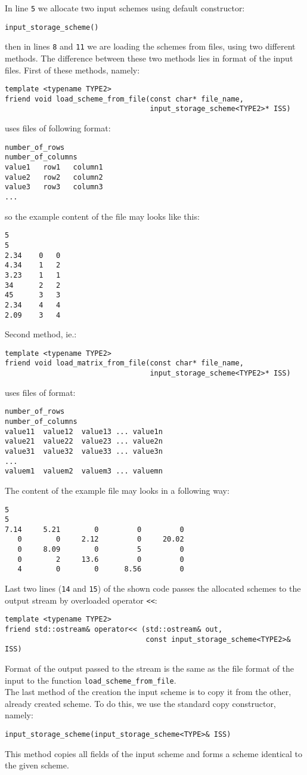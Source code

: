 In line \texttt{5} we allocate two input schemes using default constructor:
\begin{verbatim}
input_storage_scheme()
\end{verbatim}
\noindent then in lines \texttt{8} and \texttt{11} we are loading the schemes from files, using two different methods. The difference between these two methods lies in format of the input files. First of these methods, namely:
\begin{verbatim}
template <typename TYPE2>
friend void load_scheme_from_file(const char* file_name,
                                  input_storage_scheme<TYPE2>* ISS)
\end{verbatim}
\noindent uses files of following format:
\begin{verbatim}
number_of_rows
number_of_columns
value1   row1   column1
value2   row2   column2
value3   row3   column3
...
\end{verbatim}
\noindent so the example content of the file may looks like this:
\begin{verbatim}
5
5
2.34    0   0
4.34    1   2
3.23    1   1
34      2   2
45      3   3
2.34    4   4
2.09    3   4
\end{verbatim}
Second method, ie.:
\begin{verbatim}
template <typename TYPE2>
friend void load_matrix_from_file(const char* file_name,
                                  input_storage_scheme<TYPE2>* ISS)
\end{verbatim}
\noindent uses files of format:
\begin{verbatim}
number_of_rows
number_of_columns
value11  value12  value13 ... value1n
value21  value22  value23 ... value2n
value31  value32  value33 ... value3n
...
valuem1  valuem2  valuem3 ... valuemn
\end{verbatim}
The content of the example file may looks in a following way:
\begin{verbatim}
5
5
7.14     5.21        0         0         0
   0        0     2.12         0     20.02
   0     8.09        0         5         0
   0        2     13.6         0         0
   4        0        0      8.56         0
\end{verbatim}

\indent Last two lines (\texttt{14} and \texttt{15}) of the shown code passes the allocated schemes to the output stream by overloaded operator \texttt{<<}:
\begin{verbatim}
template <typename TYPE2>
friend std::ostream& operator<< (std::ostream& out,
                                 const input_storage_scheme<TYPE2>& ISS)
\end{verbatim}
\noindent Format of the output passed to the stream is the same as the file format of the input to the function \texttt{load\_scheme\_from\_file}.\\
\indent The last method of the creation the input scheme is to copy it from the other, already created scheme. To do this, we use the standard copy constructor, namely:
\begin{verbatim}
input_storage_scheme(input_storage_scheme<TYPE>& ISS)
\end{verbatim}
This method copies all fields of the input scheme and forms a scheme identical to the given scheme.

